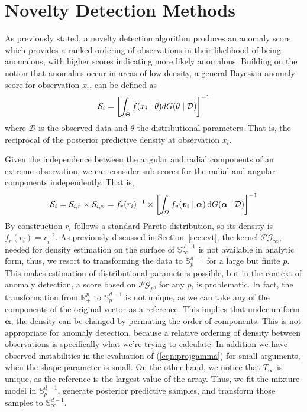 \section{Novelty Detection Methods\label{sec:novelty}}
As previously stated, a novelty detection algorithm produces an anomaly score 
    which provides a ranked ordering of observations in their likelihood of being
    anomalous, with higher scores indicating more likely anomalous. Building on 
    the notion that anomalies occur in areas of low density, a general Bayesian
    anomaly score for observation $x_i$, can be defined as
    \[
    \mathcal{S}_i = \left[\int_{\Theta}f(x_i\mid\theta)dG(\theta\mid\mathcal{D})\right]^{-1}
    \]
    where $\mathcal{D}$ is the observed data and $\theta$ the distributional
    parameters.  That is, the reciprocal of the posterior predictive density 
    at observation $x_i$.

Given the independence between the angular and radial components of an
    extreme observation, we can consider sub-scores for the radial 
    and angular components independently.  That is,
    \begin{equation}
        \label{eqn:score}
        \mathcal{S}_i = \mathcal{S}_{i,r}\times \mathcal{S}_{i,\bm{v}} = 
            f_r(r_i)^{-1}\times
            \left[\int_{\Omega} f_v(\bm{v}_i\mid\bm{\alpha})
                \,\text{d}G(\bm{\alpha}\mid\mathcal{D})\right]^{-1}
    \end{equation}
    By construction $r_i$ follows a standard Pareto distribution, so its
    density is $f_r(r_i) = r_i^{-2}$.  As previously discussed in
    Section~\ref{sec:evt}, the kernel $\mathcal{PG}_\infty$, needed for 
    density estimation on the surface of ${\mathbb S}_{\infty}^{d-1}$ is 
    not available in analytic form, thus, we resort to transforming the
    data to $\mathbb{S}_p^{d-1}$ for a large but finite $p$.
    This makes estimation of distributional parameters possible, 
    but in the context of anomaly detection, a score based on
    $\mathcal{PG}_p$, for any $p$, is problematic.  In fact, the 
    transformation from ${\mathbb R}_+^p$ to $\mathbb{S}_p^{d-1}$ is not
    unique, as we can take any of the components of the original vector
    as a reference.  This implies that
    under uniform $\bm{\alpha}$, the density can be changed by
    permuting the order of components.  This is not appropriate for anomaly
    detection, because a relative ordering of density between 
    observations is specifically what we're trying to calculate. In addition
    we have observed instabilities in the evaluation of (\ref{eqn:projgamma}) 
    for small arguments, when the shape parameter is small. On the other hand,
    we notice that $T_\infty$ is unique, as the reference is the largest value
    of the array. Thus, we fit the mixture model in $\mathbb{S}_p^{d-1}$, generate
    posterior predictive samples, and transform those samples to 
    $\mathbb{S}_\infty^{d-1}$.

